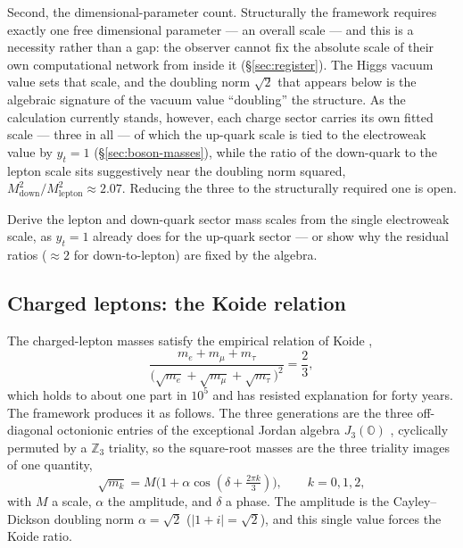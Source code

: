 Second, the dimensional-parameter count. Structurally the framework requires exactly one free
dimensional parameter --- an overall scale --- and this is a necessity rather than a gap: the
observer cannot fix the absolute scale of their own computational network from inside it
(\S\ref{sec:register}). The Higgs vacuum value sets that scale, and the doubling norm $\sqrt2$ that
appears below is the algebraic signature of the vacuum value ``doubling'' the structure. As the
calculation currently stands, however, each charge sector carries its own fitted scale --- three in
all --- of which the up-quark scale is tied to the electroweak value by $y_t = 1$
(\S\ref{sec:boson-masses}), while the ratio of the down-quark to the lepton scale sits suggestively
near the doubling norm squared, $M^2_{\mathrm{down}}/M^2_{\mathrm{lepton}} \approx 2.07$. Reducing
the three to the structurally required one is open.

\begin{openproblem}\label{op:sector-scales}
Derive the lepton and down-quark sector mass scales from the single electroweak scale, as
$y_t = 1$ already does for the up-quark sector --- or show why the residual ratios
($\approx 2$ for down-to-lepton) are fixed by the algebra.
\end{openproblem}

\subsection{Charged leptons: the Koide relation}

The charged-lepton masses satisfy the empirical relation of Koide \autocite{koide1983new},
\begin{equation}
  \frac{m_e + m_\mu + m_\tau}{\bigl(\sqrt{m_e}+\sqrt{m_\mu}+\sqrt{m_\tau}\bigr)^2} = \frac{2}{3},
  \label{eq:koide}
\end{equation}
which holds to about one part in $10^5$ and has resisted explanation for forty years. The framework
produces it as follows. The three generations are the three off-diagonal octonionic entries of the
exceptional Jordan algebra $J_3(\mathbb{O})$ \autocite{baez2002octonions,duboisviolettetodorov2019exceptional},
cyclically permuted by a $\mathbb{Z}_3$ triality, so the square-root masses are the three triality
images of one quantity,
\begin{equation}
  \sqrt{m_k} = M\bigl(1 + \alpha\cos(\delta + \tfrac{2\pi k}{3})\bigr), \qquad k = 0,1,2,
  \label{eq:z3}
\end{equation}
with $M$ a scale, $\alpha$ the amplitude, and $\delta$ a phase. The amplitude is the Cayley--Dickson
doubling norm $\alpha = \sqrt2$ ($|1+i| = \sqrt2$), and this single value forces the Koide ratio.

